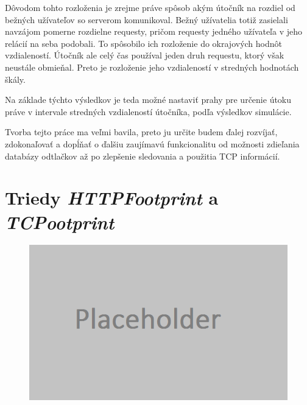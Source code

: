 \documentclass[
  digital, %
  table,   %
  lof,     %
  nolot,   %
  nocover
]{fithesis3}
\begin{document}
Dôvodom tohto rozloženia je zrejme práve spôsob akým útočník na rozdiel od
bežných užívateľov so serverom komunikoval. Bežný užívatelia totiž zasielali
navzájom pomerne rozdielne requesty, pričom requesty jedného užívateľa v jeho
relácií na seba podobali. To spôsobilo ich rozloženie do okrajových hodnôt
vzdialeností. Útočník ale celý čas používal jeden druh requestu, ktorý však
neustále obmieňal. Preto je rozloženie jeho vzdialeností v stredných hodnotách
škály. 

Na základe týchto výsledkov je teda možné nastaviť prahy pre určenie útoku
práve v intervale stredných vzdialeností útočníka, podľa výsledkov simulácie.

Tvorba tejto práce ma veľmi bavila, preto ju určite budem ďalej rozvíjať,
zdokonaľovať a dopĺňať o ďalšiu zaujímavú funkcionalitu od možnosti zdieľania
databázy odtlačkov až po zlepšenie sledovania a použitia TCP informácií.

\makeatletter\thesis@blocks@clear\makeatother
{} %
\printindex

\appendix %
\chapter{Triedy \textit{HTTPFootprint} a \textit{TCPootprint}}
\label{fig:appendix-structure}
\begin{figure}[h]
  \centering
    \includegraphics[width=\textwidth]{images/appendix-structure.png}
\end{figure}
\end{document}
